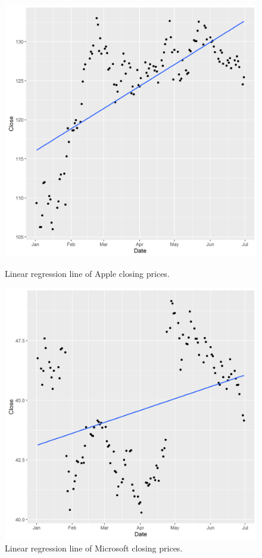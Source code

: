 \documentclass[paper=a4, fontsize=11pt]{scrartcl} %
\numberwithin{equation}{section} %
\numberwithin{figure}{section} %
\numberwithin{table}{section} %
\begin{document}
\begin{figure}[!htb]
  \includegraphics[width=\linewidth]{graph/a_reg9.png}
  \caption{Linear regression line of Apple closing prices.}
\endminipage\hfill
{}
  \includegraphics[width=\linewidth]{graph/m_reg9.png}
  \caption{Linear regression line of Microsoft closing prices.}
\endminipage\hfill
\end{figure}
\end{document}
